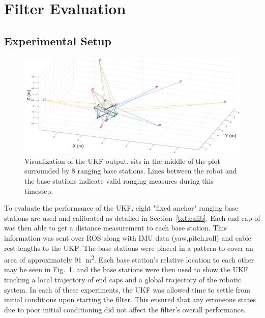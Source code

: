{\section{Filter Evaluation}
\subsection{Experimental Setup}

\begin{figure}[tpbh]
 \centering
  \includegraphics[width=\linewidth]{tex/img/matlab_figure_ranging_b45.pdf}
 \caption{Visualization of the UKF output. \SB{} sits in the middle of the plot surrounded by 8 ranging base stations. Lines between the robot and the base stations indicate valid ranging measures during this timestep.}
\label{fig:SUPERballMATLAB}
 \end{figure}
 
To evaluate the performance of the UKF, eight "fixed anchor" ranging base stations are used and calibrated as detailed in Section~\ref{txt:calib}.
Each end cap of \SB{} was then able to get a distance measurement to each base station.
This information was sent over ROS along with IMU data (yaw,pitch,roll) and cable rest lengths to the UKF.
The base stations were placed in a pattern to cover an area of approximately \SI{91}{\meter^2}. 
Each base station's relative location to each other may be seen in Fig.~\ref{fig:SUPERballMATLAB}.
\SB{} and the base stations were then used to show the UKF tracking a local trajectory of end caps and a global trajectory of the robotic system.
In each of these experiments, the UKF was allowed time to settle from initial conditions upon starting the filter.
This ensured that any erroneous states due to poor initial conditioning did not affect the filter's overall performance. 

}
